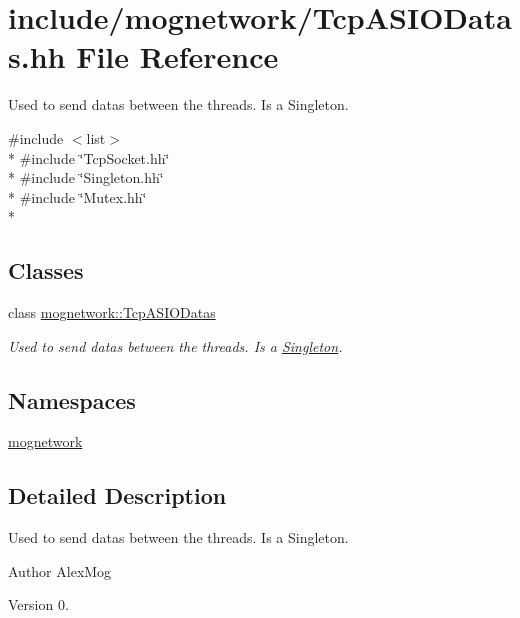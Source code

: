 \hypertarget{_tcp_a_s_i_o_datas_8hh}{\section{include/mognetwork/\-Tcp\-A\-S\-I\-O\-Datas.hh File Reference}
\label{_tcp_a_s_i_o_datas_8hh}
}


Used to send datas between the threads. Is a Singleton.  


{\ttfamily \#include $<$list$>$}\\*
{\ttfamily \#include \char`\"{}Tcp\-Socket.\-hh\char`\"{}}\\*
{\ttfamily \#include \char`\"{}Singleton.\-hh\char`\"{}}\\*
{\ttfamily \#include \char`\"{}Mutex.\-hh\char`\"{}}\\*
\subsection*{Classes}
\begin{DoxyCompactItemize}
\item 
class \hyperlink{classmognetwork_1_1_tcp_a_s_i_o_datas}{mognetwork\-::\-Tcp\-A\-S\-I\-O\-Datas}
\begin{DoxyCompactList}\small\item\em Used to send datas between the threads. Is a \hyperlink{classmognetwork_1_1_singleton}{Singleton}. \end{DoxyCompactList}\end{DoxyCompactItemize}
\subsection*{Namespaces}
\begin{DoxyCompactItemize}
\item 
\hyperlink{namespacemognetwork}{mognetwork}
\end{DoxyCompactItemize}


\subsection{Detailed Description}
Used to send datas between the threads. Is a Singleton. \begin{DoxyAuthor}{Author}
Alex\-Mog 
\end{DoxyAuthor}
\begin{DoxyVersion}{Version}
0. 
\end{DoxyVersion}
